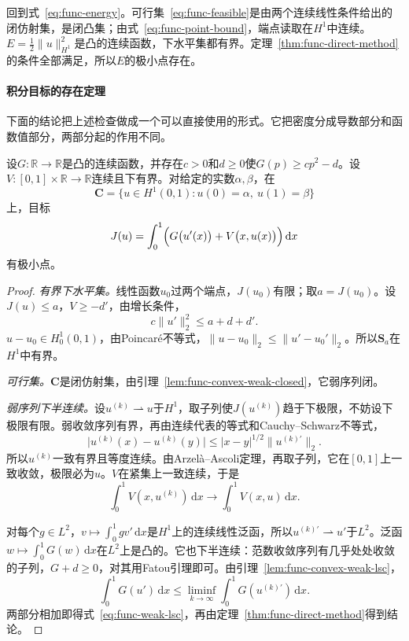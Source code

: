 回到式~\eqref{eq:func-energy}。可行集~\eqref{eq:func-feasible}是由两个连续线性条件给出的闭仿射集，是闭凸集；由式~\eqref{eq:func-point-bound}，端点读取在$H^1$中连续。$E=\frac12\lVert u\rVert_{H^1}^2$是凸的连续函数，下水平集都有界。定理~\ref{thm:func-direct-method}的条件全部满足，所以$E$的极小点存在。

\paragraph{积分目标的存在定理}
下面的结论把上述检查做成一个可以直接使用的形式。它把密度分成导数部分和函数值部分，两部分起的作用不同。

\begin{theorem}[可分离密度的存在性]
\label{thm:func-tonelli}
设$G:\mathbb{R}\to\mathbb{R}$是凸的连续函数，并存在$c>0$和$d\geq0$使$G(p)\geq cp^2-d$。设$V:[0,1]\times\mathbb{R}\to\mathbb{R}$连续且下有界。对给定的实数$\alpha,\beta$，在
\begin{equation}
 \bm{C}=\bigl\{u\in H^1(0,1):u(0)=\alpha,\ u(1)=\beta\bigr\}
 \label{eq:func-separable-feasible}
\end{equation}
上，目标
\begin{equation}
 J(u)=\int_0^1\Bigl(G\bigl(u'(x)\bigr)+V\bigl(x,u(x)\bigr)\Bigr)\,\mathrm{d}x
 \label{eq:func-separable}
\end{equation}
有极小点。
\end{theorem}

\begin{proof}
\emph{有界下水平集。}线性函数$u_0$过两个端点，$J(u_0)$有限；取$a=J(u_0)$。设$J(u)\leq a$，$V\geq-d'$，由增长条件，
\[
 c\lVert u'\rVert_2^2\leq a+d+d'.
\]
$u-u_0\in H^1_0(0,1)$，由Poincaré不等式，$\lVert u-u_0\rVert_2\leq\lVert u'-u_0'\rVert_2$。所以$\bm{S}_a$在$H^1$中有界。

\emph{可行集。}$\bm{C}$是闭仿射集，由引理~\ref{lem:func-convex-weak-closed}，它弱序列闭。

\emph{弱序列下半连续。}设$u^{(k)}\rightharpoonup u$于$H^1$，取子列使$J(u^{(k)})$趋于下极限，不妨设下极限有限。弱收敛序列有界，再由连续代表的等式和Cauchy--Schwarz不等式，
\[
 \lvert u^{(k)}(x)-u^{(k)}(y)\rvert\leq\lvert x-y\rvert^{1/2}\lVert u^{(k)\prime}\rVert_2.
\]
所以$u^{(k)}$一致有界且等度连续。由Arzelà--Ascoli定理，再取子列，它在$[0,1]$上一致收敛，极限必为$u$。$V$在紧集上一致连续，于是
\[
 \int_0^1V(x,u^{(k)})\,\mathrm{d}x\to\int_0^1V(x,u)\,\mathrm{d}x.
\]

对每个$g\in L^2$，$v\mapsto\int_0^1gv'\,\mathrm{d}x$是$H^1$上的连续线性泛函，所以$u^{(k)\prime}\rightharpoonup u'$于$L^2$。泛函$w\mapsto\int_0^1G(w)\,\mathrm{d}x$在$L^2$上是凸的。它也下半连续：范数收敛序列有几乎处处收敛的子列，$G+d\geq0$，对其用Fatou引理即可。由引理~\ref{lem:func-convex-weak-lsc}，
\[
 \int_0^1G(u')\,\mathrm{d}x\leq\liminf_{k\to\infty}\int_0^1G(u^{(k)\prime})\,\mathrm{d}x.
\]
两部分相加即得式~\eqref{eq:func-weak-lsc}，再由定理~\ref{thm:func-direct-method}得到结论。
\end{proof}

